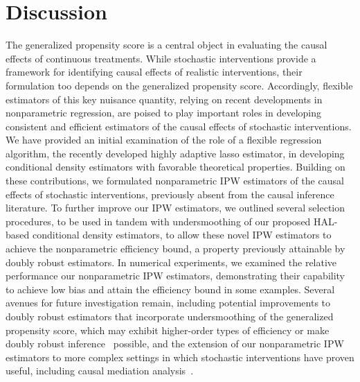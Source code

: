 \section{Discussion}\label{discuss}

The generalized propensity score is a central object in evaluating the causal
effects of continuous treatments. While stochastic interventions provide
a framework for identifying causal effects of realistic interventions, their
formulation too depends on the generalized propensity score. Accordingly,
flexible estimators of this key nuisance quantity, relying on recent
developments in nonparametric regression, are poised to play important roles in
developing consistent and efficient estimators of the causal effects of
stochastic interventions. We have provided an initial examination of the role of
a flexible regression algorithm, the recently developed highly adaptive lasso
estimator, in developing conditional density estimators with favorable
theoretical properties. Building on these contributions, we formulated
nonparametric IPW estimators of the causal effects of stochastic interventions,
previously absent from the causal inference literature. To further improve our
IPW estimators, we outlined several selection procedures, to be used in tandem
with undersmoothing of our proposed HAL-based conditional density estimators, to
allow these novel IPW estimators to achieve the nonparametric efficiency bound,
a property previously attainable by doubly robust estimators. In numerical
experiments, we examined the relative performance our nonparametric IPW
estimators, demonstrating their capability to achieve low bias and attain the
efficiency bound in some examples. Several avenues for future investigation
remain, including potential improvements to doubly robust estimators that
incorporate undersmoothing of the generalized propensity score, which may
exhibit higher-order types of efficiency or make doubly robust
inference~\citep[e.g.,][]{benkeser2017doubly} possible, and the extension of our
nonparametric IPW estimators to more complex settings in which stochastic
interventions have proven useful, including causal mediation
analysis~\citep[e.g.,][]{diaz2020causal}.
